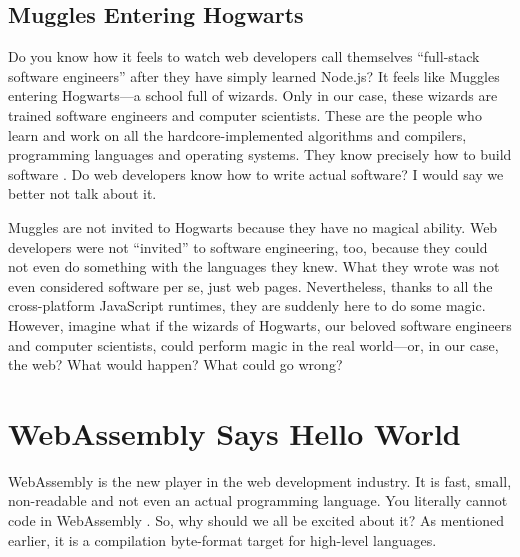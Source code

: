 \documentclass[10pt]{article}
\begin{document}
\begin{sloppypar}
  \subsection{Muggles Entering Hogwarts}
  \label{sec:muggles}

  Do you know how it feels to watch web developers call themselves “full-stack software engineers” after they have simply learned Node.js? It feels like Muggles entering Hogwarts—a school full of wizards. Only in our case, these wizards are trained software engineers and computer scientists. These are the people who learn and work on all the hardcore-implemented algorithms and compilers, programming languages and operating systems. They know precisely how to build software \citep{might_what_2011}. Do web developers know how to write actual software? I would say we better not talk about it.

  Muggles are not invited to Hogwarts because they have no magical ability. Web developers were not “invited” to software engineering, too, because they could not even do something with the languages they knew. What they wrote was not even considered software per se, just web pages. Nevertheless, thanks to all the cross-platform JavaScript runtimes, they are suddenly here to do some magic. However, imagine what if the wizards of Hogwarts, our beloved software engineers and computer scientists, could perform magic in the real world—or, in our case, the web? What would happen? What could go wrong?

  \section{WebAssembly Says Hello World}
  \label{sec:hello-world}

  WebAssembly is the new player in the web development industry. It is fast, small, non-readable and not even an actual programming language. You literally cannot code in WebAssembly \citep{rourke_learn_2018}. So, why should we all be excited about it? As mentioned earlier, it is a compilation byte-format target for high-level languages.

  \begin{figure}[ht]
    \centering
    \label{fig:wasm}
  \end{figure}


\end{sloppypar}
\end{document}
